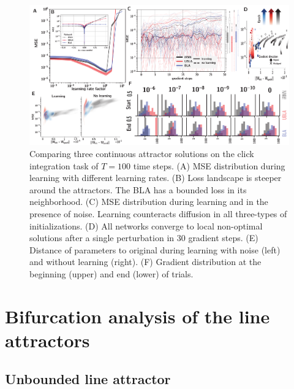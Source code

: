 \documentclass{article} %
\newcounter{ct}
\newcommand{\win}{\vW_{\text{in}}}
\newcommand{\wout}{\vW_{\text{out}}}
\newcommand{\bout}{\vb_{\text{out}}}
\theoremstyle{definition}
\theoremstyle{remark}
\begin{document}
\begin{figure}[H]
  \centering
  \includegraphics[width=\textwidth]{maintenance_h0_less.pdf}
  \caption{
  Comparing three continuous attractor solutions on the click integration task of $T=100$ time steps.
(A) MSE distribution during learning with different learning rates.
(B) Loss landscape is steeper around the attractors. The BLA has a bounded loss in its neighborhood.
(C) MSE distribution during learning and in the presence of noise. Learning counteracts diffusion in all three-types of initializations.
(D) All networks converge to local non-optimal solutions after a single perturbation in 30 gradient steps.
(E) Distance of parameters to original during learning with noise (left) and without learning (right).
(F) Gradient distribution at the beginning (upper) and end (lower) of trials.
  }
  \label{fig:maintenance_h0}
\end{figure}


\section{Bifurcation analysis of the line attractors}


\subsection{Unbounded line attractor}
%
%
\end{document}
